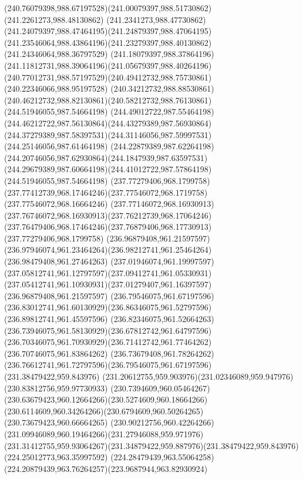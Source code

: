 {    \curveto(240.76079398,988.67197528)(241.00079397,988.51730862)(241.2261273,988.48130862)
    \curveto(241.2341273,988.47730862)(241.24079397,988.47464195)(241.24879397,988.47064195)
    \curveto(241.23546064,988.43864196)(241.23279397,988.40130862)(241.24346064,988.36797529)
    \curveto(241.18079397,988.37864196)(241.11812731,988.39064196)(241.05679397,988.40264196)
    \curveto(240.77012731,988.57197529)(240.49412732,988.75730861)(240.22346066,988.95197528)
    \curveto(240.34212732,988.88530861)(240.46212732,988.82130861)(240.58212732,988.76130861)
    \moveto(244.51946055,987.54664198)
    \curveto(244.49012722,987.55464198)(244.46212722,987.56130864)(244.43279389,987.56930864)
    \curveto(244.37279389,987.58397531)(244.31146056,987.59997531)(244.25146056,987.61464198)
    \curveto(244.22879389,987.62264198)(244.20746056,987.62930864)(244.1847939,987.63597531)
    \curveto(244.29679389,987.60664198)(244.41012722,987.57864198)(244.51946055,987.54664198)
    \moveto(237.77279406,968.1799758)
    \curveto(237.77412739,968.17464246)(237.77546072,968.1719758)(237.77546072,968.16664246)
    \curveto(237.77146072,968.16930913)(237.76746072,968.16930913)(237.76212739,968.17064246)
    \curveto(237.76479406,968.17464246)(237.76879406,968.17730913)(237.77279406,968.1799758)
    \moveto(236.96879408,961.21597597)
    \curveto(236.97946074,961.23464264)(236.98212741,961.25464264)(236.98479408,961.27464263)
    \curveto(237.01946074,961.19997597)(237.05812741,961.12797597)(237.09412741,961.05330931)
    \curveto(237.05412741,961.10930931)(237.01279407,961.16397597)(236.96879408,961.21597597)
    \moveto(236.79546075,961.67197596)
    \curveto(236.83012741,961.60130929)(236.86346075,961.52797596)(236.89812741,961.45597596)
    \curveto(236.82346075,961.52664263)(236.73946075,961.58130929)(236.67812742,961.64797596)
    \curveto(236.70346075,961.70930929)(236.71412742,961.77464262)(236.70746075,961.83864262)
    \curveto(236.73679408,961.78264262)(236.76612741,961.72797596)(236.79546075,961.67197596)
    \moveto(231.38479422,959.843976)
    \curveto(231.20612755,959.903976)(231.02346089,959.947976)(230.83812756,959.97730933)
    \curveto(230.7394609,960.05464267)(230.63679423,960.12664266)(230.5274609,960.18664266)
    \curveto(230.6114609,960.34264266)(230.6794609,960.50264265)(230.73679423,960.66664265)
    \curveto(230.90212756,960.42264266)(231.09946089,960.19464266)(231.27946088,959.971976)
    \curveto(231.31412755,959.93064267)(231.34879422,959.887976)(231.38479422,959.843976)
    \moveto(224.25012773,963.35997592)
    \curveto(224.28479439,963.55064258)(224.20879439,963.76264257)(223.9687944,963.82930924)
}

